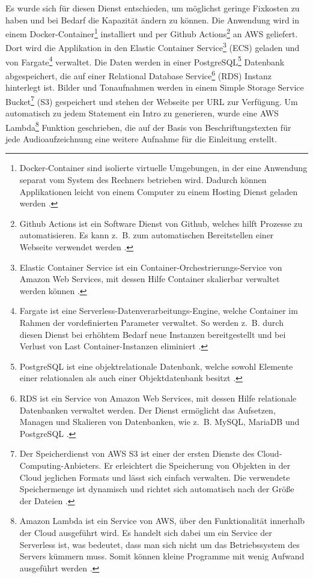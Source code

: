 Es wurde sich für diesen Dienst entschieden, um möglichst geringe Fixkosten zu haben und bei Bedarf die Kapazität ändern zu können. Die Anwendung wird in einem Docker-Container\footnote{Docker-Container sind isolierte virtuelle Umgebungen, in der eine Anwendung separat vom System des Rechners betrieben wird. Dadurch können Applikationen leicht von einem Computer zu einem Hosting Dienst geladen werden \parencite{docker_container}.} installiert und per Github Actions\footnote{Github Actions ist ein Software Dienst von Github, welches hilft Prozesse zu automatisieren. Es kann z.~B. zum automatischen Bereitstellen einer Webseite verwendet werden \parencite{github_actions}.} an AWS geliefert. Dort wird die Applikation in den Elastic Container Service\footnote{Elastic Container Service ist ein Container-Orchestrierungs-Service von Amazon Web Services, mit dessen Hilfe Container skalierbar verwaltet werden können \parencite{aws_ecs}.} (ECS) geladen und von Fargate\footnote{Fargate ist eine Serverless-Datenverarbeitungs-Engine, welche Container im Rahmen der vordefinierten Parameter verwaltet. So werden z.~B. durch diesen Dienst bei erhöhtem Bedarf neue Instanzen bereitgestellt und bei Verlust von Last Container-Instanzen eliminiert \parencite{aws_fargate}.} verwaltet. 
Die Daten werden in einer PostgreSQL\footnote{PostgreSQL ist eine objektrelationale Datenbank, welche sowohl Elemente einer relationalen als auch einer Objektdatenbank besitzt \parencite{postgresql}.} Datenbank abgespeichert, die auf einer Relational Database Service\footnote{RDS ist ein Service von Amazon Web Services, mit dessen Hilfe relationale Datenbanken verwaltet werden. Der Dienst ermöglicht das Aufsetzen, Managen und Skalieren von Datenbanken, wie z.~B. MySQL, MariaDB und PostgreSQL \parencite[vgl.][S.161 f.]{baron_aws_2016}.} (RDS) Instanz hinterlegt ist. 
Bilder und Tonaufnahmen werden in einem Simple Storage Service Bucket\footnote{Der Speicherdienst von AWS S3 ist einer der ersten Dienste des Cloud-Computing-Anbieters. Er erleichtert die Speicherung von Objekten in der Cloud jeglichen Formats und lässt sich einfach verwalten. Die verwendete Speichermenge ist dynamisch und richtet sich automatisch nach der Größe der Dateien \parencite[vgl.][S. 23]{baron_aws_2016}.} (S3) gespeichert und stehen der Webseite per URL zur Verfügung. 
Um automatisch zu jedem Statement ein Intro zu generieren, wurde eine AWS Lambda\footnote{Amazon Lambda ist ein Service von AWS, über den Funktionalität innerhalb der Cloud ausgeführt wird. Es handelt sich dabei um ein Service der Serverless ist, was bedeutet, dass man sich nicht um das Betriebssystem des Servers kümmern muss. Somit können kleine Programme mit wenig Aufwand ausgeführt werden \parencites[vgl.][Kap. 15.3]{wolff_microservices_2018}{aws_lambda}.} Funktion geschrieben, die auf der Basis von Beschriftungstexten für jede Audioaufzeichnung eine weitere Aufnahme für die Einleitung erstellt.

